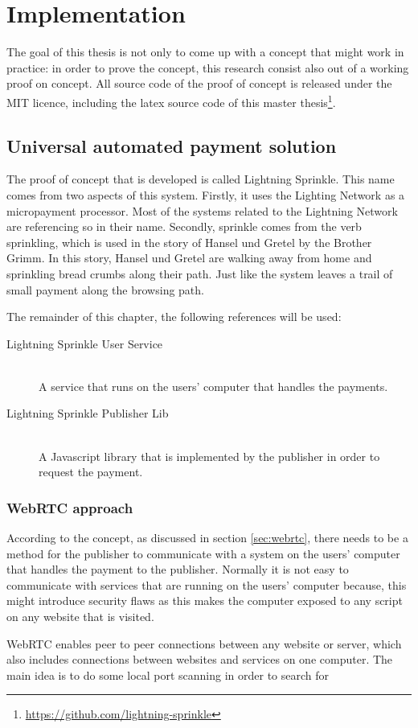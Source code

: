 \chapter{Implementation}
\label{cha:implementation}

The goal of this thesis is not only to come up with a concept that might work in practice: in order to prove the concept, this research consist also out of a working proof on concept. All source code of the proof of concept is released under the MIT licence, including the latex source code of this master thesis\footnote{\url{https://github.com/lightning-sprinkle}}.

\section{Universal automated payment solution}
The proof of concept that is developed is called Lightning Sprinkle. This name comes from two aspects of this system. Firstly, it uses the Lighting Network as a micropayment processor. Most of the systems related to the Lightning Network are referencing so in their name. Secondly, sprinkle comes from the verb sprinkling, which is used in the story of Hansel und Gretel by the Brother Grimm. In this story, Hansel und Gretel are walking away from home and sprinkling bread crumbs along their path. Just like the system leaves a trail of small payment along the browsing path. 

The remainder of this chapter, the following references will be used:

\begin{description}
  \item[Lightning Sprinkle User Service] \hfill \\ A service that runs on the users' computer that handles the payments.
  \item[Lightning Sprinkle Publisher Lib] \hfill \\ A Javascript library that is implemented by the publisher in order to request the payment.
\end{description} 



\subsection{WebRTC approach}
According to the concept, as discussed in section \ref{sec:webrtc}, there needs to be a method for the publisher to communicate with a system on the users' computer that handles the payment to the publisher. Normally it is not easy to communicate with services that are running on the users' computer because, this might introduce security flaws as this makes the computer exposed to any script on any website that is visited. 

WebRTC enables peer to peer connections between any website or server, which also includes connections between websites and services on one computer. The main idea is to do some local port scanning in order to search for 